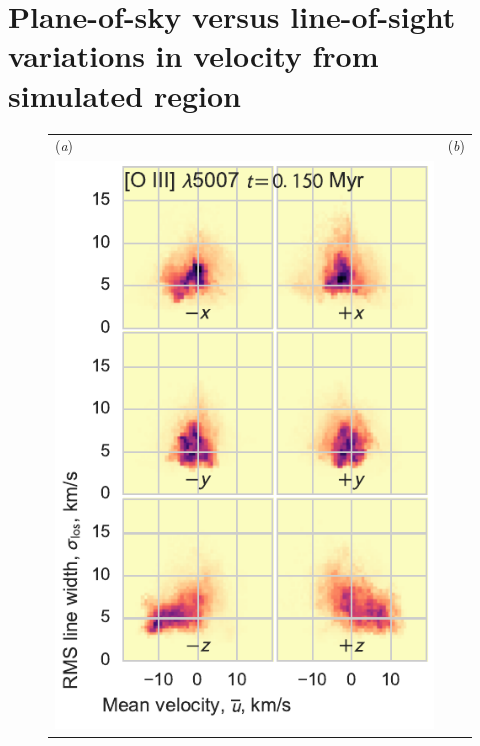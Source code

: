 \documentclass[useAMS,usenatbib]{mn2e}
\begin{document}
\appendix

\section[]{\boldmath Plane-of-sky versus line-of-sight variations in velocity from
simulated \hii{} region}

\begin{figure}
  \centering
  \begin{tabular}{@{}ll@{}}
    (\textit{a}) & (\textit{b}) \\
    \includegraphics{hist-vmean-sig-0015-O35007}

\end{tabular}
\end{figure}
\end{document}
